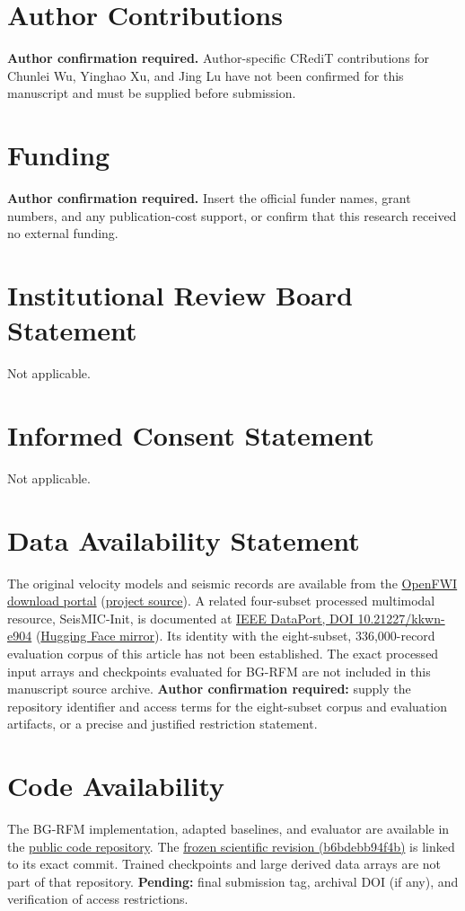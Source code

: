 \section*{Author Contributions}
\textbf{Author confirmation required.} Author-specific CRediT contributions for Chunlei Wu, Yinghao Xu, and Jing Lu have not been confirmed for this manuscript and must be supplied before submission.

\section*{Funding}
\textbf{Author confirmation required.} Insert the official funder names, grant numbers, and any publication-cost support, or confirm that this research received no external funding.

\section*{Institutional Review Board Statement}
Not applicable.

\section*{Informed Consent Statement}
Not applicable.

\section*{Data Availability Statement}
The original velocity models and seismic records are available from the \href{https://openfwi-lanl.github.io/docs/data.html}{OpenFWI download portal} (\href{https://github.com/lanl/OpenFWI}{project source}). A related four-subset processed multimodal resource, SeisMIC-Init, is documented at \href{https://doi.org/10.21227/kkwn-e904}{IEEE DataPort, DOI 10.21227/kkwn-e904} (\href{https://huggingface.co/datasets/YinghaoXu/SeisMIC-Init}{Hugging Face mirror}). Its identity with the eight-subset, 336,000-record evaluation corpus of this article has not been established. The exact processed input arrays and checkpoints evaluated for BG-RFM are not included in this manuscript source archive. \textbf{Author confirmation required:} supply the repository identifier and access terms for the eight-subset corpus and evaluation artifacts, or a precise and justified restriction statement.

\section*{Code Availability}
The BG-RFM implementation, adapted baselines, and evaluator are available in the \href{https://github.com/LT-xyh/seismic-diff-followup}{public code repository}. The \href{https://github.com/LT-xyh/seismic-diff-followup/tree/b6bdebb94f4bf2676ffbcadddd60668cfa514b50}{frozen scientific revision (b6bdebb94f4b)} is linked to its exact commit. Trained checkpoints and large derived data arrays are not part of that repository. \textbf{Pending:} final submission tag, archival DOI (if any), and verification of access restrictions.

